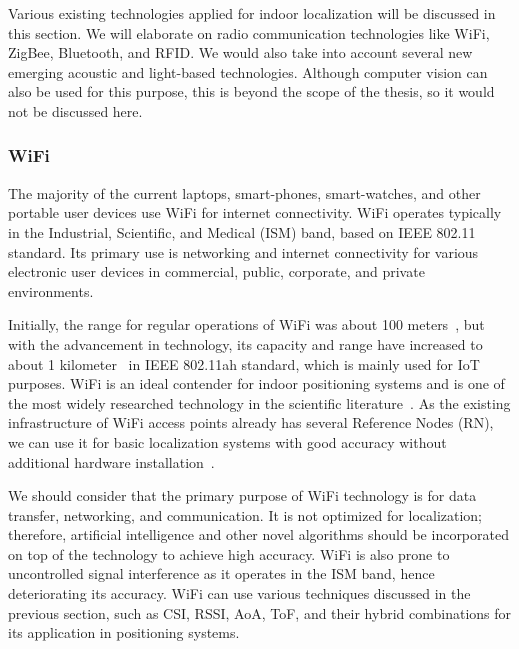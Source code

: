\documentclass[a4paper,singleside,12pt]{report} %
\begin{document}
				Various existing technologies applied for indoor localization will be discussed in this section. 
				We will elaborate on radio communication technologies like WiFi, ZigBee, Bluetooth, and RFID. 
				We would also take into account several new emerging acoustic and light-based technologies. 
				Although computer vision can also be used for this purpose, this is beyond the scope of the thesis, so it would not be discussed here. 
				
				\subsubsection{WiFi}

					The majority of the current laptops, smart-phones, smart-watches, and other portable user devices use WiFi for internet connectivity.  
					WiFi operates typically in the Industrial, Scientific, and Medical (ISM) band, based on IEEE 802.11 standard. Its primary use is networking and internet connectivity for various electronic user devices in commercial, public, corporate, and private environments.  
					
					Initially, the range for regular operations of WiFi was about 100 meters~\cite{liu2007survey}, but with the advancement in technology, its capacity and range have increased to about 1 kilometer~\cite{centenaro2016long,adame2014ieee} in IEEE 802.11ah standard, which is mainly used for IoT purposes. 
					WiFi is an ideal contender for indoor positioning systems and is one of the most widely researched technology in the scientific literature~\cite{vasisht2016decimeter,kumar2014accurate,xiong2013arraytrack,kotaru2015spotfi,xiao2013pilot,paul2009rssi,jiang2012ariel,woo2011application,chintalapudi2010indoor,liu2012push,liu2011wifi,feng2011received,cypriani2009open,zou2014online,ciurana2007wlan,hoang2013parameter,kang2012improved}. 
					As the existing infrastructure of WiFi access points already has several Reference Nodes (RN), we can use it for basic localization systems with good accuracy without additional hardware installation~\cite{kumar2014accurate}. 
					
					We should consider that the primary purpose of WiFi technology is for data transfer, networking, and communication. 
					It is not optimized for localization; therefore, artificial intelligence and other novel algorithms should be incorporated on top of the technology to achieve high accuracy. 
					WiFi is also prone to uncontrolled signal interference as it operates in the ISM band, hence deteriorating its accuracy.  
					WiFi can use various techniques discussed in the previous section, such as CSI, RSSI, AoA, ToF, and their hybrid combinations for its application in positioning systems.
\end{document}
